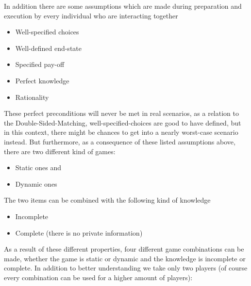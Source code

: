 In addition there are some assumptions which are made during preparation and execution by every individual who are interacting together \cite {gibbons1997gametheory}
\begin{itemize}
	\item Well-specified choices
	\item Well-defined end-state
	\item Specified pay-off
	\item Perfect knowledge
	\item Rationality 
\end{itemize}

These perfect preconditions will never be met in real scenarios, as a relation to the Double-Sided-Matching, well-specified-choices are good to have defined, but in this context, there might be chances to get into a nearly worst-case scenario instead.
But furthermore, as a consequence of these listed assumptions above, there are two different kind of games:
 
\begin{itemize}
	\item Static ones and
	\item Dynamic ones
\end{itemize}

The two items can be combined with the following kind of knowledge

\begin{itemize}
	\item Incomplete
	\item Complete (there is no private information)
\end{itemize}

As a result of these different properties, four different game combinations can be made, whether the game is static or dynamic and the knowledge is incomplete or complete.
In addition to better understanding we take only two players (of course every combination can be used for a higher amount of players):

